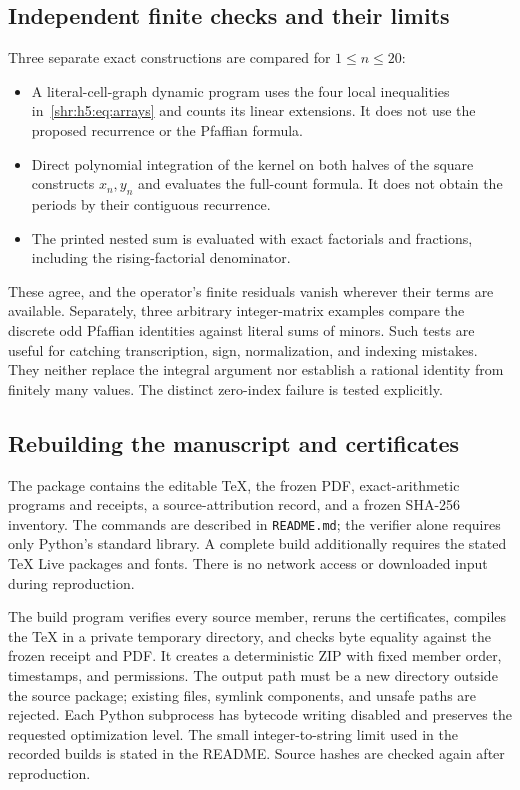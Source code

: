 \documentclass[11pt,letterpaper]{article}
\numberwithin{equation}{section}
\theoremstyle{definition}
\newcommand{\1}{\mathbf 1}
\begin{document}
\subsection{Independent finite checks and their limits}
Three separate exact constructions are compared for $1\le n\le20$:
\begin{itemize}
\item A literal-cell-graph dynamic program uses the four local inequalities
in~\eqref{shr:h5:eq:arrays} and counts its linear extensions. It does not use the
proposed recurrence or the Pfaffian formula.
\item Direct polynomial integration of the kernel on both halves of the
square constructs $x_n,y_n$ and evaluates the full-count formula. It does
not obtain the periods by their contiguous recurrence.
\item The printed nested sum is evaluated with exact factorials and
fractions, including the rising-factorial denominator.
\end{itemize}
These agree, and the operator's finite residuals vanish wherever their
terms are available. Separately, three arbitrary integer-matrix examples
compare the discrete odd Pfaffian identities against literal sums of
minors. Such tests are useful for catching transcription, sign,
normalization, and indexing mistakes. They neither replace the integral
argument nor establish a rational identity from finitely many values.
The distinct zero-index failure is tested explicitly.

\subsection{Rebuilding the manuscript and certificates}
The package contains the editable TeX, the frozen PDF, exact-arithmetic
programs and receipts, a source-attribution record, and a frozen SHA-256
inventory. The commands are described in \texttt{README.md}; the verifier
alone requires only Python's standard library. A complete build additionally
requires the stated TeX Live packages and fonts. There is no network access
or downloaded input during reproduction.

The build program verifies every source member, reruns the certificates,
compiles the TeX in a private temporary directory, and checks byte equality
against the frozen receipt and PDF. It creates a deterministic ZIP with
fixed member order, timestamps, and permissions. The output path must be a
new directory outside the source package; existing files, symlink
components, and unsafe paths are rejected. Each Python subprocess has
bytecode writing disabled and preserves the requested optimization level.
The small integer-to-string limit used in the recorded builds is stated
in the README. Source hashes are checked again after reproduction.
\end{document}
